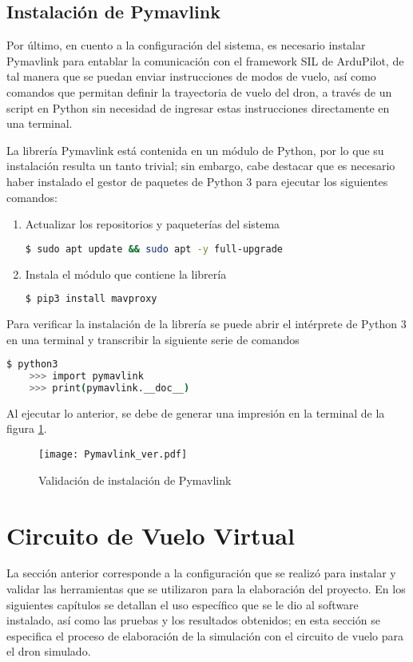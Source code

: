 \subsection{Instalación de Pymavlink}
Por último, en cuento a la configuración del sistema, es necesario instalar Pymavlink para entablar la comunicación con el framework SIL de ArduPilot, de tal manera que se puedan enviar instrucciones de modos de vuelo, así como comandos que permitan definir la trayectoria de vuelo del dron, a través de un script en Python sin necesidad de ingresar estas instrucciones directamente en una terminal.

La librería Pymavlink está contenida en un módulo de Python, por lo que su instalación resulta un tanto trivial; sin embargo, cabe destacar que es necesario haber instalado el gestor de paquetes de Python 3 para ejecutar los siguientes comandos:

\begin{enumerate}
    \item Actualizar los repositorios y paqueterías del sistema
    \begin{lstlisting}[language = bash]
        $ sudo apt update && sudo apt -y full-upgrade
    \end{lstlisting} 
    
    \item Instala el módulo que contiene la librería
    \begin{lstlisting}[language = bash]
        $ pip3 install mavproxy
    \end{lstlisting} 
\end{enumerate}

Para verificar la instalación de la librería se puede abrir el intérprete de Python 3 en una terminal y transcribir la siguiente serie de comandos

\begin{lstlisting}[language = bash]
    $ python3
    >>> import pymavlink
    >>> print(pymavlink.__doc__)
\end{lstlisting} 

Al ejecutar lo anterior, se debe de generar una impresión en la terminal de la figura \ref{fig:Pymavlink_ver}.

\begin{figure}[ht]
    \centering
    \texttt{[image: Pymavlink\_ver.pdf]}
    \caption{Validación de instalación de Pymavlink}
    \label{fig:Pymavlink_ver}
\end{figure}


\section{Circuito de Vuelo Virtual}
La sección anterior corresponde a la configuración que se realizó para instalar y validar las herramientas que se utilizaron para la elaboración del proyecto. En los siguientes capítulos se detallan el uso específico que se le dio al software instalado, así como las pruebas y los resultados obtenidos; en esta sección se especifica el proceso de elaboración de la simulación con el circuito de vuelo para el dron simulado.

